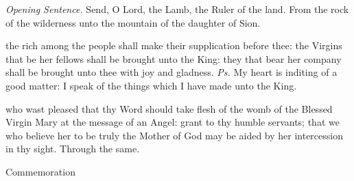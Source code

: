 



\clearpage
{}
\par\noindent
\textit{Opening Sentence.} Send, O Lord, the Lamb, the Ruler of the land. From the rock of the wilderness unto the mountain of the daughter of Sion.


\introit
{} the rich among the people shall make their supplication before thee: the Virgins that be her fellows shall be brought unto the King: they that bear her company shall be brought unto thee with joy and gladness. \textit{Ps.} My heart is inditing of a good matter: I speak of the things which I have made unto the King.

\collect
 who wast pleased that thy Word should take flesh of the womb of the Blessed Virgin Mary at the message of an Angel: grant to thy humble servants; that we who believe her to be truly the Mother of God may be aided by her intercession in thy sight. Through the same.
\begin{rubric}
    Commemoration %
\end{rubric}


